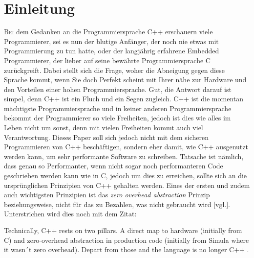 \section{Einleitung}
\lettrine{B}{ei} dem Gedanken an die Programmiersprache C++ erschauern viele Programmierer, sei
es nun der blutige Anfänger, der noch nie etwas mit Programmierung zu tun hatte, oder der
langjährig erfahrene Embedded Programmierer, der lieber auf seine bewährte Programmiersprache C
zurückgreift. Dabei stellt sich die Frage, woher die Abneigung gegen diese Sprache kommt, wenn
Sie doch Perfekt scheint mit Ihrer nähe zur Hardware und den Vorteilen einer hohen
Programmiersprache. Gut, die Antwort darauf ist simpel, denn C++ ist ein Fluch und ein Segen
zugleich. C++ ist die momentan mächtigste Programmiersprache und in keiner anderen
Programmiersprache bekommt der Programmierer so viele Freiheiten, jedoch ist dies wie alles im
Leben nicht um sonst, denn mit vielen Freiheiten kommt auch viel Verantwortung.
\newline
\newline
Dieses Paper soll sich jedoch nicht mit dem sicheren Programmieren von C++ beschäftigen, sondern
eher damit, wie C++ ausgenutzt werden kann, um sehr performante Software zu schreiben. Tatsache
ist nämlich, dass genau so Performanter, wenn nicht sogar noch performanteren Code geschrieben
werden kann wie in C, jedoch um dies zu erreichen, sollte sich an die ursprünglichen Prinzipien
von C++ gehalten werden. Eines der ersten und zudem auch wichtigsten Prinzipien ist das
\emph{zero overhead abstraction} Prinzip beziehungsweise, nicht für das zu Bezahlen, was nicht
gebraucht wird \cite{HandsOn}[vgl.]. Unterstrichen wird dies noch mit dem Zitat:

\begin{zitat}
    Technically, C++ rests on two pillars. A direct map to hardware (initially from C) and
    zero-overhead abstraction in production code (initially from Simula where it wasn´t zero
    overhead). Depart from those and the language is no longer C++ \cite{ISOC++}.
\end{zitat}


		
		
